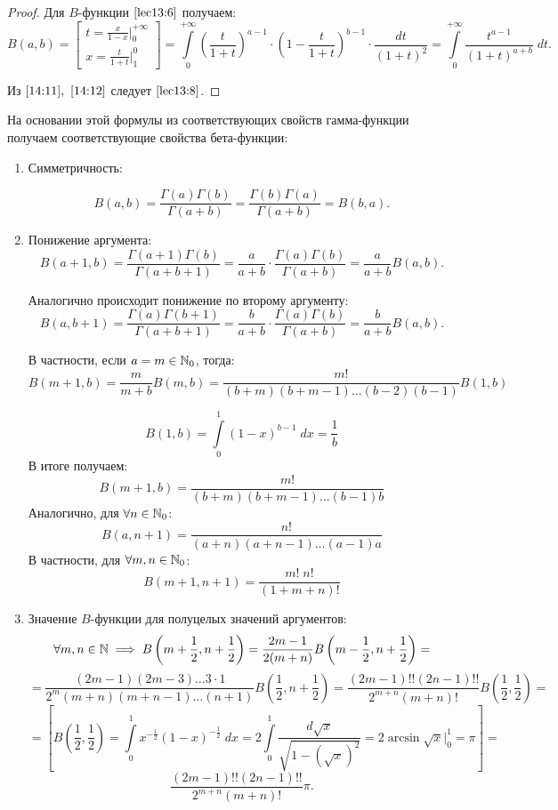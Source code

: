 \documentclass[../../main.tex]{subfiles}
\begin{document}
\begin{proof}
Для $B$-функции $\eqref{lec13:6}$ получаем: 
\begin{equation}
\label{14:12}
   B(a,b) = \left[  \begin{gathered}
t = \frac{x}{1-x} \Big|_{0}^{+\infty}\\
x = \frac{t}{1+t}  \Big|_{1}^{0} 
\end{gathered}   \right]   = \int\limits_{0}^{+\infty} \left(  \frac{t}{1+t} 
\right)^{a-1} \cdot \left(1 - \frac{t}{1+t} \right)^{b-1} \cdot 
\frac{dt}{\left( 1+t 
\right)^2} = \int\limits_{0}^{+\infty} \frac{t^{a-1}}{\left( 1+t 
\right)^{a+b}} \; dt.
\end{equation}

Из  $\eqref{14:11},\ \eqref{14:12}$ следует $\eqref{lec13:8}$.
\end{proof}

На основании 
этой формулы из соответствующих свойств гамма-функции получаем соответствующие 
свойства бета-функции:

\begin{enumerate}
	\item Симметричность: 
	
	\[  B(a,b) = \frac{\Gamma(a) \Gamma(b)}{\Gamma(a+b)} = \frac{\Gamma(b)  
	\Gamma(a) }{\Gamma(a+b)} = B(b,a).   \]
	
	\item Понижение аргумента:
	\[   B(a+1,b) = \frac{\Gamma(a+1) \Gamma(b)}{\Gamma(a+b+1)}  = \frac{a}{a+b} 
	\cdot \frac{\Gamma(a) \Gamma(b)}{\Gamma(a+b)}  = \frac{a}{a+b}  B(a,b). \]
	
	Аналогично происходит понижение по второму аргументу:
	\[  B(a,b+1) =  \frac{\Gamma(a) \Gamma(b+1)}{\Gamma(a+b+1)}  = \frac{b}{a+b} 
	\cdot \frac{\Gamma(a) \Gamma(b)}{\Gamma(a+b)}  = \frac{b}{a+b}  B(a,b). \]
	
	В частности, если $a=m \in \mathbb{N}_0$, тогда:
	\[  B(m+1,b) = \frac{m}{m+b} B(m,b) = \frac{m!}{(b+m)(b+m-1)\dots(b-2)(b-1)} 
	B(1,b)  \]
	
	\[ B(1,b) = \int\limits_{0}^{1} \left( 1-x \right) ^{b-1} \; dx = \frac{1}{b} 
	\]
	В итоге получаем:
	\[  B(m+1,b) = \frac{m!}{(b+m)(b+m-1)\dots(b-1)b}     \]
	Аналогично, для $\forall n \in \mathbb{N}_0$:
	\[  B(a,n+1) = \frac{n!}{(a+n)(a+n-1)\dots(a-1)a}  \]
	В частности, для $\forall m,n \in \mathbb{N}_0$:
	\[  B(m+1,n+1) = \frac{m! \; n!}{(1+m+n)!}   \]
	
	\item Значение $B$-функции для полуцелых значений аргументов:
	\[  \forall m,n \in \mathbb{N} \implies B\left( m+\frac{1}{2}, n+\frac{1}{2} \right) 
	= \frac{2m - 1}{2(m+n)} 
	B\left( m-\frac{1}{2}, n+\frac{1}{2} \right) = \]
	\[ = \frac{(2m-1)(2m-3) \dots 3 \cdot 1}{2^m (m+n)(m+n-1)\dots (n+1)} B\left( 
	\frac{1}{2}, n+\frac{1}{2} \right) = \frac{(2m-1)!! (2n-1)!! }{2^{m+n} 
	(m+n)!} B\left( \frac{1}{2}, \frac{1}{2} \right) =  \]
	\[ = \left[  B\left( \frac{1}{2}, \frac{1}{2} \right) = \int\limits_{0}^{1} 
	x^{-\frac{1}{2}} \left( 1-x \right)^{-\frac{1}{2}} \; dx = 2 
	\int\limits_{0}^{1} \frac{d \sqrt{x} }{\sqrt{1 - \left(\sqrt{x} \right)^2 }} 
	= 2 \arcsin{\sqrt{x}} \Big|_{0}^{1} = \pi  \right] =     \]
	\[   \frac{(2m-1)!! (2n-1)!! }{2^{m+n} (m+n)!} \pi. \]
\end{enumerate}
\end{document}
